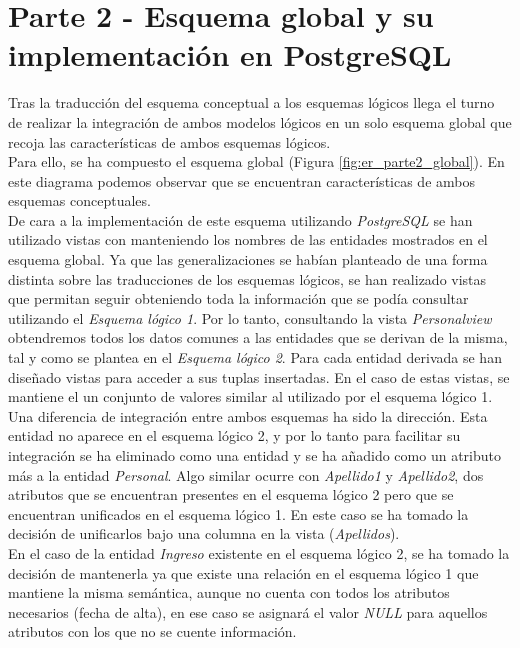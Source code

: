\documentclass{article}
\begin{document}
\section{Parte 2 - Esquema global y su implementación en PostgreSQL}

Tras la traducción del esquema conceptual a los esquemas lógicos llega el turno de realizar la integración de ambos modelos lógicos en un solo esquema global que recoja las características de ambos esquemas lógicos.\\
Para ello, se ha compuesto el esquema global (Figura \ref{fig:er_parte2_global}). En este diagrama podemos observar que se encuentran características de ambos esquemas conceptuales. \\
De cara a la implementación de este esquema utilizando \emph{PostgreSQL} se han utilizado vistas con manteniendo los nombres de las entidades mostrados en el esquema global. Ya que las generalizaciones se habían planteado de una forma distinta sobre las traducciones de los esquemas lógicos, se han realizado vistas que permitan seguir obteniendo toda la información que se podía consultar utilizando el \emph{Esquema lógico 1}. Por lo tanto, consultando la vista \emph{Personalview} obtendremos todos los datos comunes a las entidades que se derivan de la misma, tal y como se plantea en el \emph{Esquema lógico 2}. Para cada entidad derivada se han diseñado vistas para acceder a sus tuplas insertadas. En el caso de estas vistas, se mantiene el un conjunto de valores similar al utilizado por el esquema lógico 1.\\
Una diferencia de integración entre ambos esquemas ha sido la dirección. Esta entidad no aparece en el esquema lógico 2, y por lo tanto para facilitar su integración se ha eliminado como una entidad y se ha añadido como un atributo más a la entidad \emph{Personal}. Algo similar ocurre con \emph{Apellido1} y \emph{Apellido2}, dos atributos que se encuentran presentes en el esquema lógico 2 pero que se encuentran unificados en el esquema lógico 1. En este caso se ha tomado la decisión de unificarlos bajo una columna en la vista (\emph{Apellidos}).\\
En el caso de la entidad \emph{Ingreso} existente en el esquema lógico 2, se ha tomado la decisión de mantenerla ya que existe una relación en el esquema lógico 1 que mantiene la misma semántica, aunque no cuenta con todos los atributos necesarios (fecha de alta), en ese caso se asignará el valor \emph{NULL} para aquellos atributos con los que no se cuente información.\\
\end{document}
